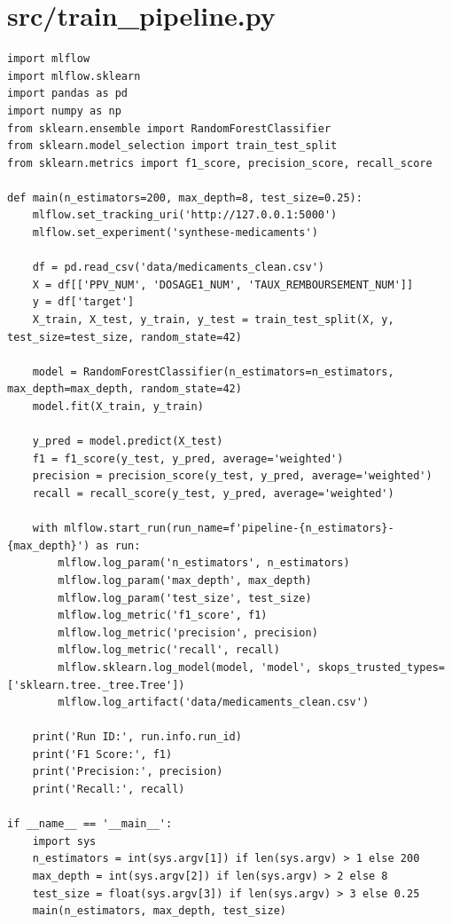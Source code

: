 \documentclass[12pt,a4paper]{report}
\begin{document}
\section{src/train\_pipeline.py}
\begin{verbatim}
import mlflow
import mlflow.sklearn
import pandas as pd
import numpy as np
from sklearn.ensemble import RandomForestClassifier
from sklearn.model_selection import train_test_split
from sklearn.metrics import f1_score, precision_score, recall_score

def main(n_estimators=200, max_depth=8, test_size=0.25):
    mlflow.set_tracking_uri('http://127.0.0.1:5000')
    mlflow.set_experiment('synthese-medicaments')

    df = pd.read_csv('data/medicaments_clean.csv')
    X = df[['PPV_NUM', 'DOSAGE1_NUM', 'TAUX_REMBOURSEMENT_NUM']]
    y = df['target']
    X_train, X_test, y_train, y_test = train_test_split(X, y, test_size=test_size, random_state=42)

    model = RandomForestClassifier(n_estimators=n_estimators, max_depth=max_depth, random_state=42)
    model.fit(X_train, y_train)

    y_pred = model.predict(X_test)
    f1 = f1_score(y_test, y_pred, average='weighted')
    precision = precision_score(y_test, y_pred, average='weighted')
    recall = recall_score(y_test, y_pred, average='weighted')

    with mlflow.start_run(run_name=f'pipeline-{n_estimators}-{max_depth}') as run:
        mlflow.log_param('n_estimators', n_estimators)
        mlflow.log_param('max_depth', max_depth)
        mlflow.log_param('test_size', test_size)
        mlflow.log_metric('f1_score', f1)
        mlflow.log_metric('precision', precision)
        mlflow.log_metric('recall', recall)
        mlflow.sklearn.log_model(model, 'model', skops_trusted_types=['sklearn.tree._tree.Tree'])
        mlflow.log_artifact('data/medicaments_clean.csv')

    print('Run ID:', run.info.run_id)
    print('F1 Score:', f1)
    print('Precision:', precision)
    print('Recall:', recall)

if __name__ == '__main__':
    import sys
    n_estimators = int(sys.argv[1]) if len(sys.argv) > 1 else 200
    max_depth = int(sys.argv[2]) if len(sys.argv) > 2 else 8
    test_size = float(sys.argv[3]) if len(sys.argv) > 3 else 0.25
    main(n_estimators, max_depth, test_size)
\end{verbatim}
\end{document}
